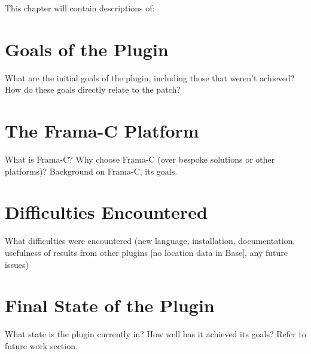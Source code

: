 This chapter will contain descriptions of:

\section{Goals of the Plugin}

What are the initial goals of the plugin, including those that weren't achieved? How do these goals directly relate to the patch?

\section{The Frama-C Platform}

What is Frama-C? Why choose Frama-C (over bespoke solutions or other platforms)? Background on Frama-C, its goals.

\section{Difficulties Encountered}

What difficulties were encountered (new language, installation, documentation, usefulness of results from other plugins [no location data in Base], any future issues)

\section{Final State of the Plugin}

What state is the plugin currently in? How well has it achieved its goals? Refer to future work section.
